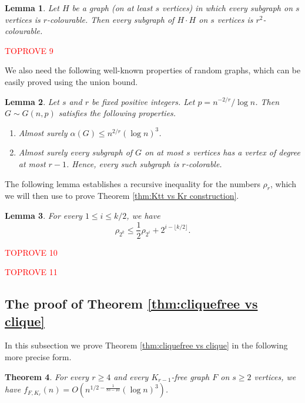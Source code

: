 \documentclass[11pt]{article}
\let\oldendproof\endproof
\renewenvironment{proof}[1][\proofname]{\oldproof[\bf #1]}{\oldendproof}
\theoremstyle{plain}
\newtheorem{theorem}{Theorem}[section]
\newtheorem{lemma}[theorem]{Lemma}
\theoremstyle{definition}
\begin{document}
\begin{lemma} \label{lem:product chromatic}
    Let $H$ be a graph (on at least $s$ vertices) in which every subgraph on $s$ vertices is $r$-colourable. Then every subgraph of $H\cdot H$ on $s$ vertices is $r^2$-colourable.
\end{lemma}

\begin{proof}\textcolor{red}{TOPROVE 9}\end{proof}
 
	We also need the following well-known properties of random graphs, which can be easily proved using the union bound.
	\begin{lemma}\label{lem:random graph properties}
		Let $s$ and $r$ be fixed positive integers. Let $p=n^{-2/r}/\log n$. Then $G \sim G(n,p)$ satisfies the following properties.
		\begin{enumerate}
			\item Almost surely $\alpha(G) \leq n^{2/r}(\log n)^3$. 
			\item Almost surely every subgraph of $G$ on at most $s$ vertices has a vertex of degree at most $r-1$. Hence, every such subgraph is $r$-colorable. 
		\end{enumerate}
	\end{lemma}

The following lemma establishes a recursive inequality for the numbers $\rho_r$, which we will then use to prove Theorem \ref{thm:Ktt vs Kr construction}.
\begin{lemma}\label{lem:rho recursion}
	For every $1\leq i\leq k/2$, we have
	$$\rho_{2^k}\leq \frac{1}{2}\rho_{2^i}+2^{i-\lfloor k/2 \rfloor}.$$
\end{lemma}

\begin{proof}\textcolor{red}{TOPROVE 10}\end{proof}

\begin{proof}\textcolor{red}{TOPROVE 11}\end{proof}

\subsection{The proof of Theorem \ref{thm:cliquefree vs clique}}

In this subsection we prove Theorem \ref{thm:cliquefree vs clique} in the following more precise form.

\begin{theorem} \label{thm:cliquefree vs clique precise}
    For every $r\geq 4$ and every $K_{r-1}$-free graph $F$ on $s\geq 2$ vertices, we have $f_{F,K_r}(n)=O(n^{1/2-\frac{1}{8s-10}}(\log n)^3)$.
\end{theorem}
\end{document}
